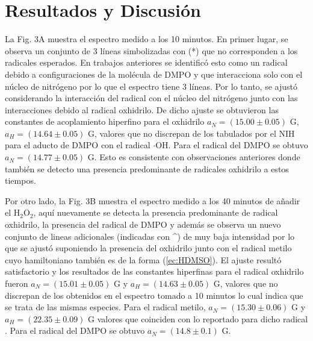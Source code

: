 \documentclass[aps,prl,reprint,superscriptaddress,showkeys]{revtex4-2}
\begin{document}
\section{Resultados y Discusión}

La Fig. 3A muestra el espectro medido a los 10 minutos. En primer lugar, se observa un conjunto de 3 líneas simbolizadas con (*) que no corresponden a los radicales esperados. En trabajos anteriores \cite{maldonado_actividad_nodate} se identificó esto como un radical debido a configuraciones de la molécula de DMPO y que interacciona solo con el núcleo de nitrógeno por lo que el espectro tiene 3 líneas. Por lo tanto, se ajustó considerando la interacción del radical con el núcleo del nitrógeno junto con las interacciones debido al radical oxhidrilo. De dicho ajuste se obtuvieron las constantes de acoplamiento hiperfino para el oxhidrilo $a_N = (15.00 \pm 0.05)$ G, $a_H =  (14.64 \pm 0.05)$ G, valores que no discrepan de los tabulados por el NIH para el aducto de DMPO con el radical $\cdot$OH. Para el radical del DMPO se obtuvo $a_N = (14.77 \pm 0.05)$ G. Esto es consistente con observaciones \cite{maldonado_actividad_nodate} anteriores donde también se detecto una presencia predominante de radicales oxhidrilo a estos tiempos. 


Por otro lado, la Fig. 3B muestra el espectro medido a los 40 minutos de añadir el H$_2$O$_2$, aquí nuevamente se detecta la presencia predominante de radical oxhidrilo, la presencia del radical de DMPO y además se observa un nuevo conjunto de lineas adicionales (indicadas con \^{}) de muy baja intensidad por lo que se ajustó suponiendo la presencia  del oxhidrilo junto con el radical metilo cuyo hamiltoniano también es de la forma (\ref*{ec:HDMSO}). El ajuste resultó satisfactorio y los resultados de las constantes hiperfinas para el radical oxhidrilo fueron $a_N = (15.01 \pm 0.05)$ G y $a_H = (14.63 \pm 0.05)$ G, valores que no discrepan de los obtenidos en el espectro tomado a 10 minutos lo cual indica que se trata de las mismas especies. Para el radical metilo, $a_N = (15.30 \pm 0.06)$ G y $a_H = (22.35 \pm 0.09)$ G valores que coinciden con lo reportado para dicho radical \cite{maldonado_actividad_nodate}. Para el radical del DMPO se obtuvo $a_N = (14.8 \pm 0.1)$ G. 
\end{document}
